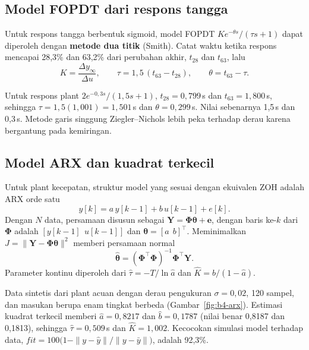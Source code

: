 \subsection{Model FOPDT dari respons tangga}
Untuk respons tangga berbentuk sigmoid, model FOPDT $Ke^{-\theta s}/(\tau s+1)$ dapat diperoleh dengan \textbf{metode dua titik} (Smith). Catat waktu ketika respons mencapai 28,3\% dan 63,2\% dari perubahan akhir, $t_{28}$ dan $t_{63}$, lalu
\begin{equation}
	K = \frac{\Delta y_\infty}{\Delta u},\qquad \tau = 1{,}5\,(t_{63} - t_{28}),\qquad \theta = t_{63} - \tau.
\end{equation}

\begin{contoh}
	Untuk respons plant $2e^{-0{,}3s}/(1{,}5s+1)$, $t_{28} = 0{,}799$\,s dan $t_{63} = 1{,}800$\,s, sehingga $\tau = 1{,}5(1{,}001) = 1{,}501$\,s dan $\theta = 0{,}299$\,s. Nilai sebenarnya 1,5\,s dan 0,3\,s. Metode garis singgung Ziegler--Nichols lebih peka terhadap derau karena bergantung pada kemiringan.
\end{contoh}

\subsection{Model ARX dan kuadrat terkecil}
Untuk plant kecepatan, struktur model yang sesuai dengan ekuivalen ZOH adalah ARX orde satu
\begin{equation}
	y[k] = a\,y[k-1] + b\,u[k-1] + e[k].
\end{equation}
Dengan $N$ data, persamaan disusun sebagai $\mathbf{Y} = \boldsymbol\Phi\boldsymbol\theta + \mathbf{e}$, dengan baris ke-$k$ dari $\boldsymbol\Phi$ adalah $[y[k-1]\ \ u[k-1]]$ dan $\boldsymbol\theta = [a\ \ b]^\top$. Meminimalkan $J = \|\mathbf{Y} - \boldsymbol\Phi\boldsymbol\theta\|^2$ memberi persamaan normal
\begin{equation}
	\hat{\boldsymbol\theta} = (\boldsymbol\Phi^\top\boldsymbol\Phi)^{-1}\boldsymbol\Phi^\top\mathbf{Y}.
\end{equation}
Parameter kontinu diperoleh dari $\hat\tau = -T/\ln\hat a$ dan $\hat K = \hat b/(1-\hat a)$.

\begin{contoh}
	Data sintetis dari plant acuan dengan derau pengukuran $\sigma = 0{,}02$, 120 sampel, dan masukan berupa enam tingkat berbeda (Gambar~\ref{fig:b4-arx}). Estimasi kuadrat terkecil memberi $\hat a = 0{,}8217$ dan $\hat b = 0{,}1787$ (nilai benar 0,8187 dan 0,1813), sehingga $\hat\tau = 0{,}509$\,s dan $\hat K = 1{,}002$. Kecocokan simulasi model terhadap data, $\textit{fit} = 100\big(1 - \|y-\hat y\|/\|y-\bar y\|\big)$, adalah 92,3\%.
\end{contoh}

